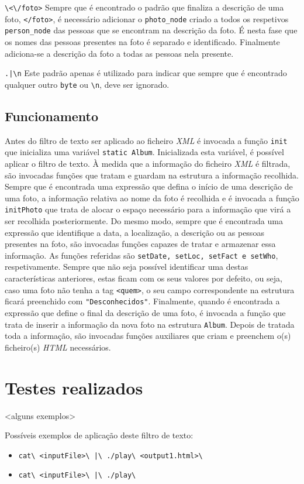\verb!\<\/foto>!
Sempre que é encontrado o padrão que finaliza a descrição de uma foto, \verb!</foto>!, é necessário adicionar o \verb!photo_node! criado a todos os respetivos \verb!person_node! das pessoas que se encontram na descrição da foto. É nesta fase que os nomes das pessoas presentes na foto é separado e identificado. Finalmente adiciona-se a descrição da foto a todas as pessoas nela presente.

\verb!.|\n!
Este padrão apenas é utilizado para indicar que sempre que é encontrado qualquer outro \verb!byte! ou \verb!\n!, deve ser ignorado.

\subsection{Funcionamento}
\label{seq:museu-func}
Antes do filtro de texto ser aplicado ao ficheiro \emph{XML} é invocada a função \verb!init! que inicializa uma variável \verb!static Album!. Inicializada esta variável, é possível aplicar o filtro de texto.
À medida que a informação do ficheiro \emph{XML} é filtrada, são invocadas funções que tratam e guardam na estrutura a informação recolhida.
Sempre que é encontrada uma expressão que defina o início de uma descrição de uma foto, a informação relativa ao nome da foto é recolhida e é invocada a função \verb!initPhoto! que trata de alocar o espaço necessário para a informação que virá a ser recolhida posteriormente. Do mesmo modo, sempre que é encontrada uma expressão que identifique a data, a localização, a descrição ou as pessoas presentes na foto, são invocadas funções capazes de tratar e armazenar essa informação. As funções referidas são \verb!setDate, setLoc, setFact e setWho!, respetivamente. Sempre que não seja possível identificar uma destas características anteriores, estas ficam com os seus valores por defeito, ou seja, caso uma foto não tenha a tag \verb!<quem>!, o seu campo correspondente na estrutura ficará preenchido com \verb!"Desconhecidos"!. Finalmente, quando é encontrada a expressão que define o final da descrição de uma foto, é invocada a função que trata de inserir a informação da nova foto na estrutura \verb!Album!.
Depois de tratada toda a informação, são invocadas funções auxiliares que criam e preenchem o(s) ficheiro(s) \emph{HTML} necessários.

\section{Testes realizados}
\label{seq:museu-test}
<alguns exemplos>

Possíveis exemplos de aplicação deste filtro de texto:
\begin{itemize}
\item\verb!cat\ <inputFile>\ |\ ./play\ <output1.html>\ !
\item\verb!cat\ <inputFile>\ |\ ./play\ !
\end{itemize}